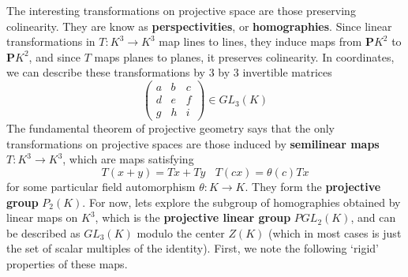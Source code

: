 The interesting transformations on projective space are those preserving colinearity. They are know as {\bf perspectivities}, or {\bf homographies}. Since linear transformations in $T: K^3 \to K^3$ map lines to lines, they induce maps from $\mathbf{P}K^2$ to $\mathbf{P}K^2$, and since $T$ maps planes to planes, it preserves colinearity. In coordinates, we can describe these transformations by 3 by 3 invertible matrices
%
\[ \begin{pmatrix} a & b & c \\ d & e & f \\ g & h & i \end{pmatrix} \in GL_3(K) \]
%
The fundamental theorem of projective geometry says that the only transformations on projective spaces are those induced by {\bf semilinear maps} $T: K^3 \to K^3$, which are maps satisfying
%
\[ T(x + y) = Tx + Ty\ \ \ \ T(cx) = \theta(c) Tx \]
%
for some particular field automorphism $\theta: K \to K$. They form the {\bf projective group} $P_2(K)$. For now, lets explore the subgroup of homographies obtained by linear maps on $K^3$, which is the {\bf projective linear group} $PGL_2(K)$, and can be described as $GL_3(K)$ modulo the center $Z(K)$ (which in most cases is just the set of scalar multiples of the identity). First, we note the following `rigid' properties of these maps.

